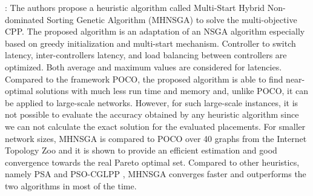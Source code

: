 \documentclass[a4paper,10pt]{article}
\begin{document}



\cite{VaMo18}: The authors propose a heuristic algorithm called Multi-Start Hybrid Non-dominated Sorting Genetic Algorithm (MHNSGA) to solve the multi-objective CPP. The proposed algorithm is an adaptation of an NSGA algorithm especially based on greedy initialization and multi-start mechanism. Controller to switch latency, inter-controllers latency, and load balancing between controllers are optimized. Both average and maximum values are considered for latencies. Compared to the framework POCO, the proposed algorithm is able to find near-optimal solutions with much less run time and memory and, unlike POCO, it can be applied to large-scale networks. However, for such large-scale instances, it is not possible to evaluate the accuracy obtained by any heuristic algorithm since we can not calculate the exact solution for the evaluated placements. For smaller network sizes, MHNSGA is compared to POCO over 40 graphs from the Internet Topology Zoo and it is shown to provide an efficient estimation and good convergence towards the real Pareto optimal set. Compared to other heuristics, namely PSA \cite{LaGe15} and PSO-CGLPP \cite{GaWa15}, MHNSGA converges faster and outperforms the two algorithms in most of the time.  
\end{document}
